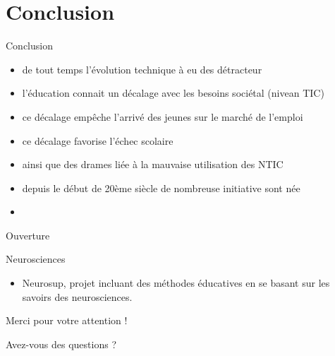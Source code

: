 \section{Conclusion}

\begin{frame}{Conclusion}
  \begin{itemize}
    \item de tout temps l'évolution technique à eu des détracteur
    \item l'éducation connait un décalage avec les besoins sociétal (nivean TIC)
    \item ce décalage empêche l'arrivé des jeunes sur le marché de l'emploi
    \item ce décalage favorise l'échec scolaire
    \item ainsi que des drames liée à la mauvaise utilisation des NTIC
    \item depuis le début de 20ème siècle de nombreuse initiative sont née
    \item 
  \end{itemize}
\end{frame}

\begin{frame}{Ouverture}
  \begin{block}{Neurosciences}
    \begin{itemize}
      \item Neurosup, projet incluant des méthodes éducatives en se basant sur les savoirs des neurosciences.
    \end{itemize}
  \end{block}
\end{frame}

\begin{frame}
\Huge
\begin{center}
	Merci pour votre attention !
	
	Avez-vous des questions ?
\end{center}
\end{frame}

